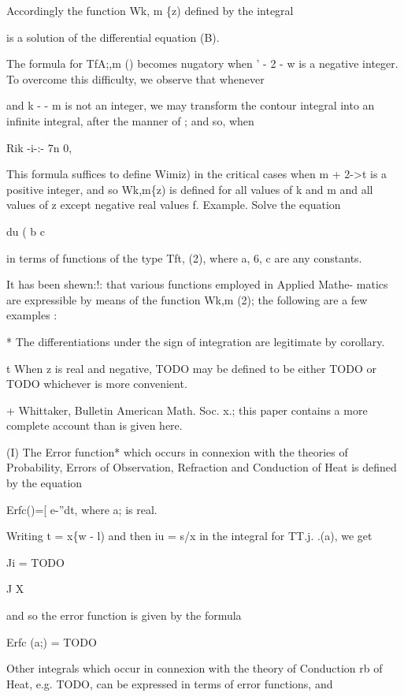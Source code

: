 Accordingly the function Wk, m \{z) defined by the integral

is a solution of the differential equation (B).

The formula for TfA;,m () becomes nugatory when ' - 2 - w is a
negative integer. To overcome this difficulty, we observe that
whenever

and k - - m is not an integer, we may transform the contour integral
into an infinite integral, after the manner of ; and so, when

Rik -i-:- 7n 0,

This formula suffices to define Wimiz) in the critical cases when m
+ 2->t is a positive integer, and so Wk,m\{z) is defined for all
values of k and m and all values of z except negative real values f.
Example. Solve the equation

du ( b c

in terms of functions of the type Tft, (2), where a, 6, c are any
constants.


It has been shewn:!: that various functions employed in Applied Mathe-
matics are expressible by means of the function Wk,m (2); the
following are a few examples :

* The differentiations under the sign of integration are legitimate by  corollary.

t When z is real and negative, TODO may be defined to be either TODO
or TODO whichever is more convenient.

+ Whittaker, Bulletin American Math. Soc. x.; this paper contains a
more complete account than is given here.

%
%
(I) The Error function* which occurs in connexion with the theories of
Probability, Errors of Observation, Refraction and Conduction of Heat
is defined by the equation

Erfc()=[ e-''dt, where a; is real.

Writing t = x\{w - l) and then iu = s/x in the integral for TT.j.
.(a), we get

Ji = TODO

J X

and so the error function is given by the formula

Erfc (a;) = TODO

Other integrals which occur in connexion with the theory of Conduction
rb of Heat, e.g. TODO, can be expressed in terms of error functions,
and

